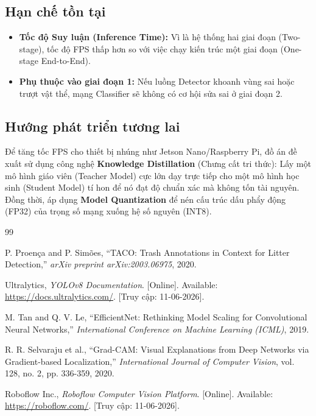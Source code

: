 \documentclass[12pt, a4paper]{article}
\begin{document}
\subsection{Hạn chế tồn tại}
\begin{itemize}
    \item \textbf{Tốc độ Suy luận (Inference Time):} Vì là hệ thống hai giai đoạn (Two-stage), tốc độ FPS thấp hơn so với việc chạy kiến trúc một giai đoạn (One-stage End-to-End).
    \item \textbf{Phụ thuộc vào giai đoạn 1:} Nếu luồng Detector khoanh vùng sai hoặc trượt vật thể, mạng Classifier sẽ không có cơ hội sửa sai ở giai đoạn 2.
\end{itemize}

\subsection{Hướng phát triển tương lai}
Để tăng tốc FPS cho thiết bị nhúng như Jetson Nano/Raspberry Pi, đồ án đề xuất sử dụng công nghệ \textbf{Knowledge Distillation} (Chưng cất tri thức): Lấy một mô hình giáo viên (Teacher Model) cực lớn dạy trực tiếp cho một mô hình học sinh (Student Model) tí hon để nó đạt độ chuẩn xác mà không tốn tài nguyên. Đồng thời, áp dụng \textbf{Model Quantization} để nén cấu trúc dấu phẩy động (FP32) của trọng số mạng xuống hệ số nguyên (INT8).

\newpage
\begin{thebibliography}{99}
    
    P. Proença and P. Simões, ``TACO: Trash Annotations in Context for Litter Detection,'' \textit{arXiv preprint arXiv:2003.06975}, 2020.
    
    Ultralytics, \textit{YOLOv8 Documentation}. [Online]. Available: \url{https://docs.ultralytics.com/}. [Truy cập: 11-06-2026].

    M. Tan and Q. V. Le, ``EfficientNet: Rethinking Model Scaling for Convolutional Neural Networks,'' \textit{International Conference on Machine Learning (ICML)}, 2019.
    
    R. R. Selvaraju et al., ``Grad-CAM: Visual Explanations from Deep Networks via Gradient-based Localization,'' \textit{International Journal of Computer Vision}, vol. 128, no. 2, pp. 336-359, 2020.

    Roboflow Inc., \textit{Roboflow Computer Vision Platform}. [Online]. Available: \url{https://roboflow.com/}. [Truy cập: 11-06-2026].
\end{thebibliography}
\end{document}
